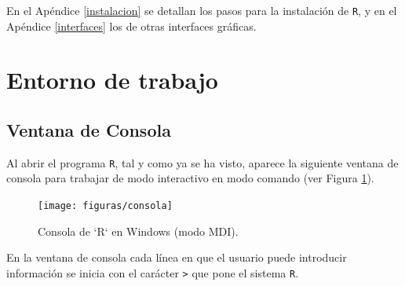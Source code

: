 \documentclass[
]{book}
\theoremstyle{break}
\begin{document}
En el Apéndice \ref{instalacion} se detallan los pasos para la instalación de \texttt{R},
y en el Apéndice \ref{interfaces} los de otras interfaces gráficas.

\hypertarget{entorno-de-trabajo}{%
\section{Entorno de trabajo}\label{entorno-de-trabajo}}

\hypertarget{ventana-de-consola}{%
\subsection{Ventana de Consola}\label{ventana-de-consola}}

Al abrir el programa \texttt{R}, tal y como ya
se ha visto, aparece la siguiente ventana de consola para trabajar de
modo interactivo en modo comando (ver Figura \ref{fig:consola}).

\begin{figure}[!htb]

{\centering \texttt{[image: figuras/consola]} 

}

\caption{Consola de `R` en Windows (modo MDI).}\label{fig:consola}
\end{figure}

En la ventana de consola cada línea en que el usuario puede
introducir información se inicia con el carácter \texttt{\textgreater{}} que pone el sistema
\texttt{R}.
\end{document}
